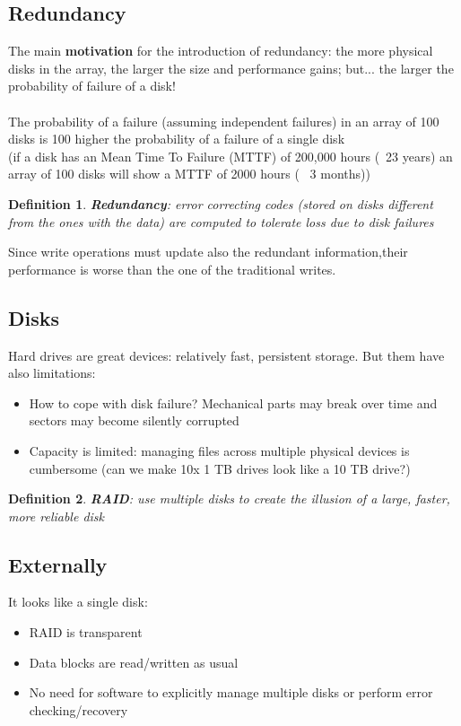 \documentclass[10pt, oneside]{article}
\newtheorem{defn}{Definition}
\begin{document}
\subsection{Redundancy}
The main {\bf motivation} for the introduction of redundancy: the more physical disks in the array, the larger the size and performance gains; but... the larger the probability of failure of a disk!\\\\The probability of a failure (assuming independent failures) in an array of 100 disks is 100 higher the probability of a failure of a single disk\\(if a disk has an Mean Time To Failure (MTTF) of 200,000 hours (~23 years) an array of 100 disks will show a MTTF of 2000 hours (~ 3 months))
\begin{defn}
    {\bf Redundancy}: error correcting codes (stored on disks different from the ones with the data) are computed to tolerate loss due to disk failures
\end{defn}Since write operations must update also the redundant information,their performance is worse than the one of the traditional writes.
\subsection{Disks}
Hard drives are great devices: relatively fast, persistent storage. But them have also limitations:\begin{itemize}
    \item How to cope with disk failure? Mechanical parts may break over time and sectors may become silently corrupted
    \item Capacity is limited: managing files across multiple physical devices is cumbersome (can we make 10x 1 TB drives look like a 10 TB drive?)
\end{itemize}
\begin{defn}
    {\bf RAID}: use multiple disks to create the illusion of a large, faster, more reliable disk
\end{defn}
\subsection{Externally}
It looks like a single disk:
\begin{itemize}
    \item RAID is transparent
    \item Data blocks are read/written as usual
    \item No need for software to explicitly manage multiple disks or perform error checking/recovery
\end{itemize}
\end{document}
